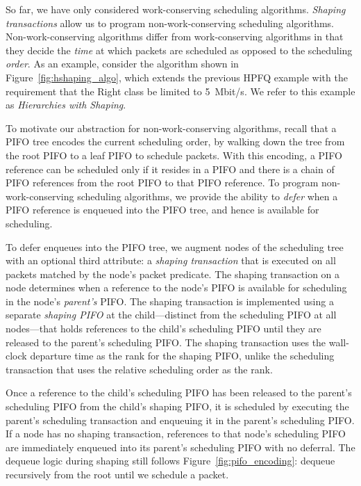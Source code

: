 So far, we have only considered work-conserving scheduling algorithms. {\em
Shaping transactions} allow us to program non-work-conserving scheduling
algorithms. Non-work-conserving algorithms differ from work-conserving
algorithms in that they decide the {\em time} at which packets are scheduled as
opposed to the scheduling {\em order}. As an example, consider the algorithm
shown in Figure~\ref{fig:hshaping_algo}, which extends the previous HPFQ
example with the requirement that the Right class be limited to 5~Mbit/s. We
refer to this example as {\em Hierarchies with Shaping}.

To motivate our abstraction for non-work-conserving algorithms, recall that a
PIFO tree encodes the current scheduling order, by walking down the tree from
the root PIFO to a leaf PIFO to schedule packets.  With this encoding, a PIFO
reference can be scheduled only if it resides in a PIFO and there is a chain of
PIFO references from the root PIFO to that PIFO reference. To program
non-work-conserving scheduling algorithms, we provide the ability to {\em
defer} when a PIFO reference is enqueued into the PIFO tree, and hence is
available for scheduling.

To defer enqueues into the PIFO tree, we augment nodes of the scheduling tree
with an optional third attribute: a {\em shaping transaction} that is executed
on all packets matched by the node's packet predicate. The shaping transaction
on a node determines when a reference to the node's PIFO is available for
scheduling in the node's {\em parent's} PIFO. The shaping transaction is
implemented using a separate {\em shaping PIFO} at the child---distinct from
the scheduling PIFO at all nodes---that holds references to the child's
scheduling PIFO until they are released to the parent's scheduling PIFO.  The
shaping transaction uses the wall-clock departure time as the rank for the
shaping PIFO, unlike the scheduling transaction that uses the relative
scheduling order as the rank.

Once a reference to the child's scheduling PIFO has been released to the
parent's scheduling PIFO from the child's shaping PIFO, it is scheduled by
executing the parent's scheduling transaction and enqueuing it in the parent's
scheduling PIFO. If a node has no shaping transaction, references to that
node's scheduling PIFO are immediately enqueued into its parent's scheduling
PIFO with no deferral.  The dequeue logic during shaping still follows
Figure~\ref{fig:pifo_encoding}: dequeue recursively from the root until we
schedule a packet.

